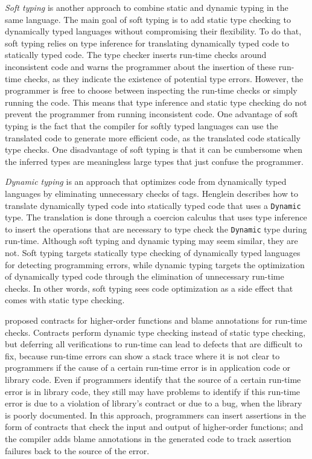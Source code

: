 \emph{Soft typing} \citep{cartwright1991soft} is another approach
to combine static and dynamic typing in the same language.
The main goal of soft typing is to add static type checking to
dynamically typed languages without compromising their flexibility.
To do that, soft typing relies on type inference for
translating dynamically typed code to statically typed code.
The type checker inserts run-time checks around inconsistent code and
warns the programmer about the insertion of these run-time checks,
as they indicate the existence of potential type errors.
However, the programmer is free to choose between inspecting the
run-time checks or simply running the code.
This means that type inference and static type checking do
not prevent the programmer from running inconsistent code.
One advantage of soft typing is the fact that the compiler for
softly typed languages can use the translated code to generate
more efficient code, as the translated code statically type checks.
One disadvantage of soft typing is that it can be cumbersome when
the inferred types are meaningless large types that just confuse the
programmer.

\emph{Dynamic typing} \citep{henglein1994dts} is an approach
that optimizes code from dynamically typed languages by eliminating
unnecessary checks of tags.
Henglein describes how to translate dynamically typed code into
statically typed code that uses a \texttt{Dynamic} type.
The translation is done through a coercion calculus that uses type
inference to insert the operations that are necessary to type check
the \texttt{Dynamic} type during run-time.
Although soft typing and dynamic typing may seem similar, they are not.
Soft typing targets statically type checking of dynamically typed
languages for detecting programming errors, while
dynamic typing targets the optimization of dynamically
typed code through the elimination of unnecessary run-time checks.
In other words, soft typing sees code optimization as a side effect
that comes with static type checking.

\citet{findler2002chf} proposed contracts for higher-order functions
and blame annotations for run-time checks.
Contracts perform dynamic type checking instead of static type checking,
but deferring all verifications to run-time can lead to defects
that are difficult to fix, because run-time errors can show a
stack trace where it is not clear to programmers if the cause of a
certain run-time error is in application code or library code.
Even if programmers identify that the source of a certain run-time
error is in library code, they still may have problems to identify
if this run-time error is due to a violation of library's contract
or due to a bug, when the library is poorly documented.
In this approach, programmers can insert assertions in the form of
contracts that check the input and output of higher-order functions;
and the compiler adds blame annotations in the generated code
to track assertion failures back to the source of the error.

